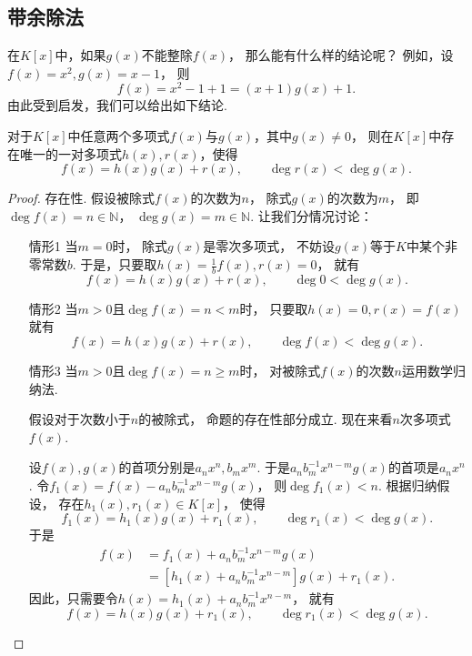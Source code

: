 \subsection{带余除法}
在\(K[x]\)中，如果\(g(x)\)不能整除\(f(x)\)，
那么能有什么样的结论呢？
例如，设\(f(x)=x^2,
g(x)=x-1\)，
则\[
	f(x)=x^2-1+1=(x+1)g(x)+1.
\]
由此受到启发，我们可以给出如下结论.
\begin{theorem}\label{theorem:多项式.带余除法}
对于\(K[x]\)中任意两个多项式\(f(x)\)与\(g(x)\)，其中\(g(x)\neq0\)，
则在\(K[x]\)中存在唯一的一对多项式\(h(x),r(x)\)，使得\[
	f(x) = h(x) g(x) + r(x),
	\qquad
	\deg r(x) < \deg g(x).
\]
\begin{proof}
存在性.
假设被除式\(f(x)\)的次数为\(n\)，
除式\(g(x)\)的次数为\(m\)，
即\(\deg f(x)=n\in\mathbb{N}\)，
\(\deg g(x)=m\in\mathbb{N}\).
让我们分情况讨论：\begin{enumerate}
	\item[情形1]
	当\(m=0\)时，
	除式\(g(x)\)是零次多项式，
	不妨设\(g(x)\)等于\(K\)中某个非零常数\(b\).
	于是，只要取\(h(x) = \frac1b f(x), r(x) = 0\)，
	就有\[
		f(x) = h(x) g(x) + r(x),
		\qquad
		\deg 0 < \deg g(x).
	\]

	\item[情形2]
	当\(m>0\)且\(\deg f(x) = n < m\)时，
	只要取\(h(x) = 0, r(x) = f(x)\)
	就有\[
		f(x) = h(x) g(x) + r(x), \qquad
		\deg f(x) < \deg g(x).
	\]

	\item[情形3]
	当\(m>0\)且\(\deg f(x) = n \geq m\)时，
	对被除式\(f(x)\)的次数\(n\)运用数学归纳法.

	假设对于次数小于\(n\)的被除式，
	命题的存在性部分成立.
	现在来看\(n\)次多项式\(f(x)\).

	设\(f(x),g(x)\)的首项分别是\(a_n x^n,b_m x^m\).
	于是\(a_n b_m^{-1} x^{n-m} g(x)\)的首项是\(a_n x^n\).
	令\(f_1(x) = f(x) - a_n b_m^{-1} x^{n-m} g(x)\)，
	则\(\deg f_1(x) < n\).
	根据归纳假设，
	存在\(h_1(x),r_1(x) \in K[x]\)，
	使得\[
		f_1(x) = h_1(x) g(x) + r_1(x), \qquad
		\deg r_1(x) < \deg g(x).
	\]
	于是\begin{align*}
		f(x)
		&= f_1(x) + a_n b_m^{-1} x^{n-m} g(x) \\
		&= [h_1(x) + a_n b_m^{-1} x^{n-m}] g(x) + r_1(x).
	\end{align*}
	因此，只需要令\(h(x) = h_1(x) + a_n b_m^{-1} x^{n-m}\)，
	就有\[
		f(x) = h(x) g(x) + r_1(x),
		\qquad
		\deg r_1(x) < \deg g(x).
	\]
\end{enumerate}


\end{proof}
\end{theorem}

